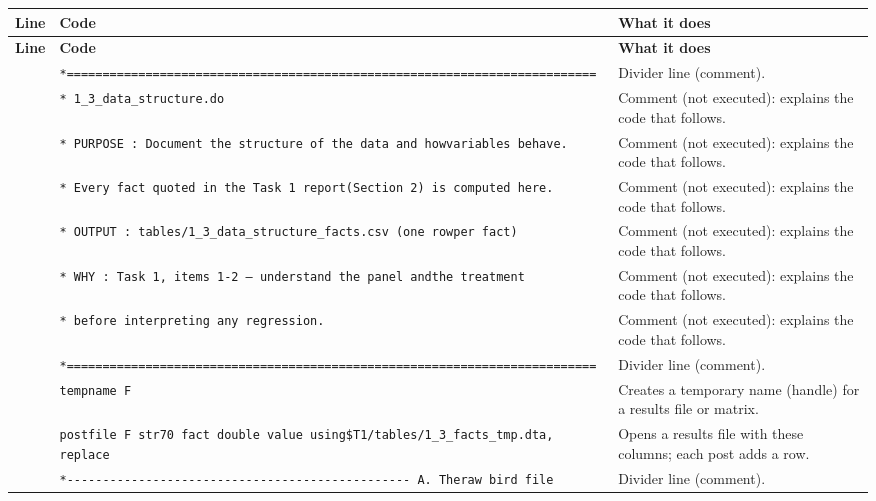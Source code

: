 \documentclass[10pt]{article}
\newcommand{\codetable}[1]{%
{\footnotesize
\begin{longtable}{>{\raggedleft\arraybackslash}p{0.55cm}>{\raggedright\arraybackslash}p{8.3cm}>{\raggedright\arraybackslash}p{8.0cm}}
\toprule \textbf{Line} & \textbf{Code} & \textbf{What it does}\\ \midrule \endfirsthead
\toprule \textbf{Line} & \textbf{Code} & \textbf{What it does}\\ \midrule \endhead
\bottomrule \endfoot
#1
\end{longtable}}}
\begin{document}
\codetable{1 & \texttt{*=========================================================\newline \hspace*{1em}=================} & Divider line (comment).\\
2 & \texttt{* 1\_3\_data\_structure.do} & Comment (not executed): explains the code that follows.\\
3 & \texttt{* PURPOSE : Document the structure of the data and how\newline \hspace*{1em}variables behave.} & Comment (not executed): explains the code that follows.\\
4 & \texttt{*           Every fact quoted in the Task 1 report\newline \hspace*{1em}(Section 2) is computed here.} & Comment (not executed): explains the code that follows.\\
5 & \texttt{* OUTPUT  : tables/1\_3\_data\_structure\_facts.csv  (one row\newline \hspace*{1em}per fact)} & Comment (not executed): explains the code that follows.\\
6 & \texttt{* WHY     : Task 1, items 1-{}2 — understand the panel and\newline \hspace*{1em}the treatment} & Comment (not executed): explains the code that follows.\\
7 & \texttt{*           before interpreting any regression.} & Comment (not executed): explains the code that follows.\\
8 & \texttt{*=========================================================\newline \hspace*{1em}=================} & Divider line (comment).\\
9 & \texttt{tempname F} & Creates a temporary name (handle) for a results file or matrix.\\
10 & \texttt{postfile \textasciigrave{}F\textquotesingle{} str70 fact double value using\newline \hspace*{1em}\textquotedbl{}\$T1/tables/1\_3\_facts\_tmp.dta\textquotedbl{}, replace} & Opens a results file with these columns; each post adds a row.\\
12 & \texttt{*-{}-{}-{}-{}-{}-{}-{}-{}-{}-{}-{}-{}-{}-{}-{}-{}-{}-{}-{}-{}-{}-{}-{}-{}-{}-{}-{}-{}-{}-{}-{}-{}-{}-{}-{}-{}-{}-{}-{}-{}-{}-{}-{}-{}-{}-{}-{}-{} A. The\newline \hspace*{1em}raw bird file} & Divider line (comment).\\
}
\end{document}
